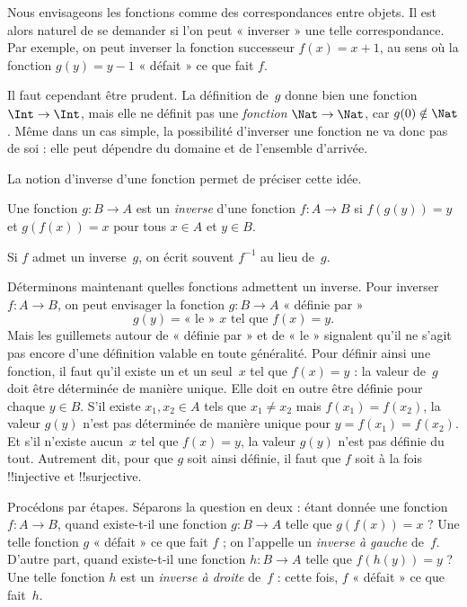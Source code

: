 \documentclass[../../../include/open-logic-section]{subfiles}
\begin{document}

\begin{explain}
Nous envisageons les fonctions comme des correspondances entre objets.
Il est alors naturel de se demander si l’on peut « inverser » une telle
correspondance. Par exemple, on peut inverser la fonction successeur
$f(x) = x + 1$, au sens où la fonction $g(y) = y - 1$ « défait »
ce que fait $f$.

Il faut cependant être prudent. La définition de~$g$ donne bien une
fonction $\Int \to \Int$, mais elle ne définit pas une \emph{fonction}
$\Nat \to \Nat$, car $g(0) \notin \Nat$. Même dans un cas simple,
la possibilité d’inverser une fonction ne va donc pas de soi :
elle peut dépendre du domaine et de l’ensemble d’arrivée.

La notion d’inverse d’une fonction permet de préciser cette idée.
\end{explain}

\begin{defn}
Une fonction $g\colon B \to A$ est un \emph{inverse} d’une fonction
$f\colon A \to B$ si $f(g(y)) = y$ et $g(f(x)) = x$ pour tous
$x \in A$ et $y \in B$.
\end{defn}

Si $f$ admet un inverse~$g$, on écrit souvent $f^{-1}$ au lieu de~$g$.

\begin{explain}
Déterminons maintenant quelles fonctions admettent un inverse.
Pour inverser $f\colon A \to B$, on peut envisager la fonction
$g\colon B \to A$ « définie par »
\[
g(y) = \text{« le » $x$ tel que $f(x) = y$.}
\]
Mais les guillemets autour de « définie par » et de « le » signalent
qu’il ne s’agit pas encore d’une définition valable en toute généralité.
Pour définir ainsi une fonction, il faut qu’il existe un et un seul~$x$
tel que $f(x) = y$ : la valeur de~$g$ doit être déterminée de manière
unique. Elle doit en outre être définie pour chaque $y \in B$.
S’il existe $x_1,x_2 \in A$ tels que $x_1 \neq x_2$ mais
$f(x_1) = f(x_2)$, la valeur $g(y)$ n’est pas déterminée de manière
unique pour $y = f(x_1) = f(x_2)$. Et s’il n’existe aucun~$x$ tel que
$f(x) = y$, la valeur $g(y)$ n’est pas définie du tout.
Autrement dit, pour que $g$ soit ainsi définie, il faut que $f$ soit
à la fois !!{injective} et !!{surjective}.

Procédons par étapes. Séparons la question en deux : étant donnée une
fonction~$f\colon A \to B$, quand existe-t-il une fonction
$g\colon B \to A$ telle que $g(f(x)) = x$ ? Une telle fonction $g$
« défait » ce que fait $f$ ; on l’appelle un \emph{inverse à gauche}
de~$f$. D’autre part, quand existe-t-il une fonction $h\colon B \to A$
telle que $f(h(y)) = y$ ? Une telle fonction $h$ est un
\emph{inverse à droite} de~$f$ : cette fois, $f$ « défait » ce que fait~$h$.
\end{explain}
\end{document}
